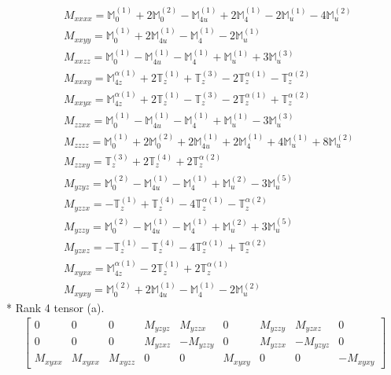 \documentclass[fleqn,8pt,landscape]{jsarticle}
\begin{document}
\begin{align*}
& M_{xxxx} = \mathbb{M}_{0}^{(1)} + 2 \mathbb{M}_{0}^{(2)} - \mathbb{M}_{4u}^{(1)} + 2 \mathbb{M}_{4}^{(1)} - 2 \mathbb{M}_{u}^{(1)} - 4 \mathbb{M}_{u}^{(2)} \\
& M_{xxyy} = \mathbb{M}_{0}^{(1)} + 2 \mathbb{M}_{4u}^{(1)} - \mathbb{M}_{4}^{(1)} - 2 \mathbb{M}_{u}^{(1)} \\
& M_{xxzz} = \mathbb{M}_{0}^{(1)} - \mathbb{M}_{4u}^{(1)} - \mathbb{M}_{4}^{(1)} + \mathbb{M}_{u}^{(1)} + 3 \mathbb{M}_{u}^{(3)} \\
& M_{xxxy} = \mathbb{M}_{4z}^{\alpha(1)} + 2 \mathbb{T}_{z}^{(1)} + \mathbb{T}_{z}^{(3)} - 2 \mathbb{T}_{z}^{\alpha(1)} - \mathbb{T}_{z}^{\alpha(2)} \\
& M_{xxyx} = \mathbb{M}_{4z}^{\alpha(1)} + 2 \mathbb{T}_{z}^{(1)} - \mathbb{T}_{z}^{(3)} - 2 \mathbb{T}_{z}^{\alpha(1)} + \mathbb{T}_{z}^{\alpha(2)} \\
& M_{zzxx} = \mathbb{M}_{0}^{(1)} - \mathbb{M}_{4u}^{(1)} - \mathbb{M}_{4}^{(1)} + \mathbb{M}_{u}^{(1)} - 3 \mathbb{M}_{u}^{(3)} \\
& M_{zzzz} = \mathbb{M}_{0}^{(1)} + 2 \mathbb{M}_{0}^{(2)} + 2 \mathbb{M}_{4u}^{(1)} + 2 \mathbb{M}_{4}^{(1)} + 4 \mathbb{M}_{u}^{(1)} + 8 \mathbb{M}_{u}^{(2)} \\
& M_{zzxy} = \mathbb{T}_{z}^{(3)} + 2 \mathbb{T}_{z}^{(4)} + 2 \mathbb{T}_{z}^{\alpha(2)} \\
& M_{yzyz} = \mathbb{M}_{0}^{(2)} - \mathbb{M}_{4u}^{(1)} - \mathbb{M}_{4}^{(1)} + \mathbb{M}_{u}^{(2)} - 3 \mathbb{M}_{u}^{(5)} \\
& M_{yzzx} = - \mathbb{T}_{z}^{(1)} + \mathbb{T}_{z}^{(4)} - 4 \mathbb{T}_{z}^{\alpha(1)} - \mathbb{T}_{z}^{\alpha(2)} \\
& M_{yzzy} = \mathbb{M}_{0}^{(2)} - \mathbb{M}_{4u}^{(1)} - \mathbb{M}_{4}^{(1)} + \mathbb{M}_{u}^{(2)} + 3 \mathbb{M}_{u}^{(5)} \\
& M_{yzxz} = - \mathbb{T}_{z}^{(1)} - \mathbb{T}_{z}^{(4)} - 4 \mathbb{T}_{z}^{\alpha(1)} + \mathbb{T}_{z}^{\alpha(2)} \\
& M_{xyxx} = \mathbb{M}_{4z}^{\alpha(1)} - 2 \mathbb{T}_{z}^{(1)} + 2 \mathbb{T}_{z}^{\alpha(1)} \\
& M_{xyxy} = \mathbb{M}_{0}^{(2)} + 2 \mathbb{M}_{4u}^{(1)} - \mathbb{M}_{4}^{(1)} - 2 \mathbb{M}_{u}^{(2)}
\end{align*}
* Rank 4 tensor (a).
\begin{align*}
\begin{bmatrix} 0 & 0 & 0 & M_{yzyz} & M_{yzzx} & 0 & M_{yzzy} & M_{yzxz} & 0 \\ 0 & 0 & 0 & M_{yzxz} & - M_{yzzy} & 0 & M_{yzzx} & - M_{yzyz} & 0 \\ M_{xyxx} & M_{xyxx} & M_{xyzz} & 0 & 0 & M_{xyxy} & 0 & 0 & - M_{xyxy} \end{bmatrix}
\end{align*}
\end{document}
